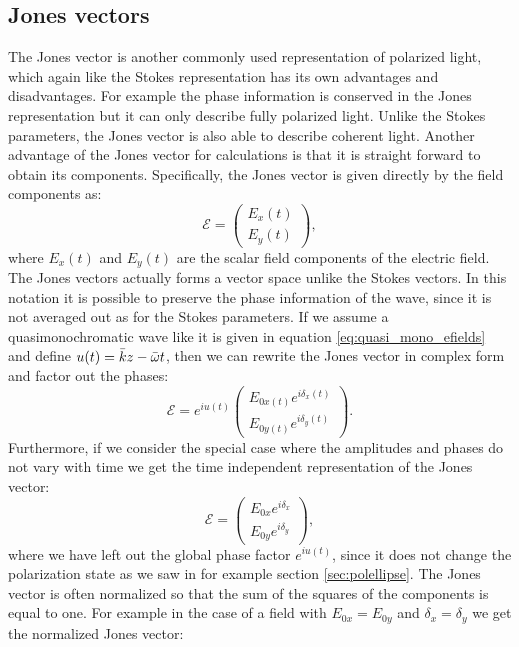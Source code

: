 \subsection{Jones vectors}
\label{sec:jones_vectors}
The Jones vector is another commonly used representation of polarized light, which again like the Stokes representation has its own advantages and disadvantages. For example the phase information is conserved in the Jones representation but it can only describe fully polarized light. Unlike the Stokes parameters, the Jones vector is also able to describe coherent light. Another advantage of the Jones vector for calculations is that it is straight forward to obtain its components. Specifically, the Jones vector is given directly by the field components as:
\begin{equation}
    \label{eq:jones_vector1}
    \bm{\mathcal{E}} = 
    \begin{pmatrix}
    E_x(t) \\
    E_y(t)
    \end{pmatrix},
\end{equation}
where $E_x(t)$ and $E_y(t)$ are the scalar field components of the electric field. The Jones vectors actually forms a vector space unlike the Stokes vectors. In this notation it is possible to preserve the phase information of the wave, since it is not averaged out as for the Stokes parameters. If we assume a quasimonochromatic wave like it is given in equation \ref{eq:quasi_mono_efields} and define $u(t)=\Bar{k}z-\Bar{\omega}t$, then we can rewrite the Jones vector in complex form and factor out the phases:
\begin{equation}
    \label{eq:jones_vector2}
    \bm{\mathcal{E}} = e^{iu(t)}
    \begin{pmatrix}
    E_{0x(t)}e^{i\delta_x(t)} \\
    E_{0y(t)}e^{i\delta_y(t)}
    \end{pmatrix}.
\end{equation}
 Furthermore, if we consider the special case where the amplitudes and phases do not vary with time we get the time independent representation of the Jones vector:
 \begin{equation}
    \label{eq:jones_vector3}
    \bm{\mathcal{E}}=
    \begin{pmatrix}
    E_{0x}e^{i\delta_x} \\
    E_{0y}e^{i\delta_y}
    \end{pmatrix},
\end{equation}
where we have left out the global phase factor $e^{iu(t)}$, since it does not change the polarization state as we saw in for example section \ref{sec:polellipse}. The Jones vector is often normalized so that the sum of the squares of the components is equal to one. For example in the case of a field with $E_{0x}=E_{0y}$ and $\delta_x=\delta_y$ we get the normalized Jones vector:

